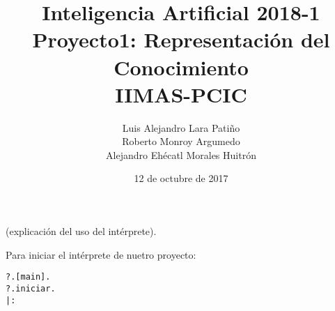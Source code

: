 \documentclass[11pt]{article}
\title{Inteligencia Artificial 2018-1 \\ Proyecto1: Representación del Conocimiento\\
\small{IIMAS-PCIC}}
\author{Luis Alejandro Lara Patiño\\Roberto Monroy Argumedo\\
Alejandro Ehécatl Morales Huitrón}
\date{12 de octubre de 2017}
\newcommand{\bt}{\begin{alltt}}
\newcommand{\et}{\end{alltt}}
\begin{document}
\maketitle

(explicación del uso del intérprete).

Para iniciar el intérprete de nuetro proyecto:
\bt
?. [main].
?. iniciar.
|:
\et
\end{document}
